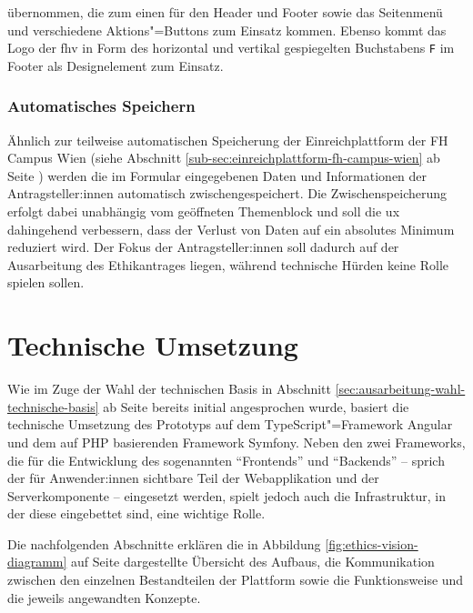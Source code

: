 \documentclass[a4paper,12pt,twoside]{scrreprt}
\begin{document}
\noindent übernommen, die zum einen für den Header und Footer sowie das Seitenmenü und verschiedene Aktions"=Buttons zum Einsatz kommen. Ebenso kommt das Logo der \ac{fhv} in Form des horizontal und vertikal gespiegelten Buchstabens \texttt{F} im Footer als Designelement zum Einsatz.

\subsubsection*{Automatisches Speichern}
 \label{sub-sub-sec:automatsiches-speichern}

 Ähnlich zur teilweise automatischen Speicherung der Einreichplattform der FH Campus Wien (siehe Abschnitt \ref{sub-sec:einreichplattform-fh-campus-wien} ab Seite \pageref{sub-sec:einreichplattform-fh-campus-wien}) werden die im Formular eingegebenen Daten und Informationen der Antragsteller:innen automatisch zwischengespeichert. Die Zwischenspeicherung erfolgt dabei unabhängig vom geöffneten Themenblock und soll die \ac{ux} dahingehend verbessern, dass der Verlust von Daten auf ein absolutes Minimum reduziert wird. Der Fokus der Antragsteller:innen soll dadurch auf der Ausarbeitung des Ethikantrages liegen, während technische Hürden keine Rolle spielen sollen.

\section{Technische Umsetzung}
\label{sec:ausarbeitung-technische-umsetzung}

Wie im Zuge der Wahl der technischen Basis in Abschnitt \ref{sec:ausarbeitung-wahl-technische-basis} ab Seite \pageref{sec:ausarbeitung-wahl-technische-basis} bereits initial angesprochen wurde, basiert die technische Umsetzung des Prototyps auf dem TypeScript"=Framework Angular und dem auf PHP basierenden Framework Symfony. Neben den zwei Frameworks, die für die Entwicklung des sogenannten \enquote{Frontends} und \enquote{Backends} -- sprich der für Anwender:innen sichtbare Teil der Webapplikation und der Serverkomponente -- eingesetzt werden, spielt jedoch auch die Infrastruktur, in der diese eingebettet sind, eine wichtige Rolle.

Die nachfolgenden Abschnitte erklären die in Abbildung \ref{fig:ethics-vision-diagramm} auf Seite \pageref{fig:ethics-vision-diagramm} dargestellte Übersicht des Aufbaus, die Kommunikation zwischen den einzelnen Bestandteilen der Plattform sowie die Funktionsweise und die jeweils angewandten Konzepte.
\end{document}
